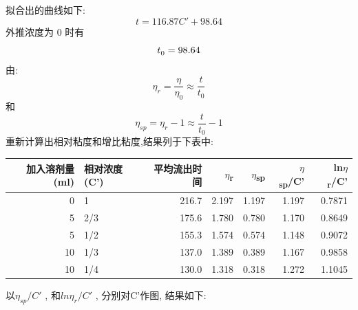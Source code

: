 \documentclass[11pt]{report}
\begin{document}
拟合出的曲线如下:
\[
t=116.87C'+98.64
\]
外推浓度为 0 时有
\[
t_{0}^{\*}=98.64
\]
由:
\[
\eta_{r}=\frac{\eta}{\eta_{0}}\approx \frac{t}{t_{0}}
\]
和
\[
\eta_{sp}=\eta_{r}-1\approx \frac{t}{t_{0}}-1
\]
重新计算出相对粘度和增比粘度,结果列于下表中:
\begin{center}
\begin{tabular}{rlrrrrr}
加入溶剂量(ml) & 相对浓度(C') & 平均流出时间 & \(\eta\)\textsubscript{r} & \(\eta\)\textsubscript{sp} & \(\eta\)\textsubscript{sp}/C' & ln\(\eta\)\textsubscript{r}/C'\\
\hline
0 & 1 & 216.7 & 2.197 & 1.197 & 1.197 & 0.7871\\
5 & 2/3 & 175.6 & 1.780 & 0.780 & 1.170 & 0.8649\\
5 & 1/2 & 155.3 & 1.574 & 0.574 & 1.148 & 0.9072\\
10 & 1/3 & 137.0 & 1.389 & 0.389 & 1.167 & 0.9858\\
10 & 1/4 & 130.0 & 1.318 & 0.318 & 1.272 & 1.1045\\
\end{tabular}
\end{center}

以\(\eta_{sp}/C'\) , 和\(ln\eta_{r}/C'\) , 分别对C'作图, 结果如下:
\end{document}
